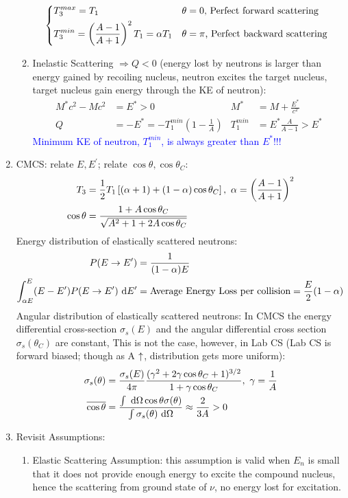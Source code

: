 \documentclass{school-22.101-notes}
\begin{document}
\begin{enumerate}
\begin{enumerate}
\begin{align}
\begin{dcases*}
        T_3^{max} = T_1 &  $\theta = 0$,  Perfect forward scattering \\
        T_3^{min} = \left( \frac{A-1}{A+1} \right)^2 T_1 = \alpha T_1 & $\theta = \pi$, Perfect backward scattering 
        \end{dcases*}
        \end{align}
    \item Inelastic Scattering $\Rightarrow Q < 0$ (energy lost by neutrons is larger than energy gained by recoiling nucleus, neutron excites the target nucleus, target nucleus gain energy through the KE of neutron):
\begin{align}
M^* c^2 - M c^2 &= E^* > 0  & M^* &= M + \frac{E^*}{c^2} \label{M*} \\
Q &= - E^* = -T_1^{min} \left( 1 - \frac{1}{A} \right) & T_1^{min} &= E^* \frac{A}{A-1} > E^* 
\end{align}
\textcolor{blue}{Minimum KE of neutron, $T_1^{min}$, is always greater than $E^*$!!!}
\end{enumerate}
%
\item CMCS: relate $E, E^{\prime}$; relate $\cos \theta, \cos \theta_C$:
    \begin{align}
     T_3 &= \frac{1}{2} T_1 \left[ (\alpha+1 ) + (1-\alpha) \cos \theta_C \right], \mbox{ } \alpha = \left( \frac{A-1}{A+1} \right)^2 \\
    \cos \theta &= \frac{1 + A \cos \theta_C}{\sqrt{A^2 + 1 + 2A \cos \theta_C}} 
    \end{align}
Energy distribution of elastically scattered neutrons:
    \begin{align}
    P(E \to E^{\prime}) &= \frac{1}{(1-\alpha)E} \\
    \int_{\alpha E}^E (E - E^{\prime}) P(E \to E^{\prime}) \mbox{ }\mathrm{d} E^{\prime} &= \mbox{Average Energy Loss per collision}  = \frac{E}{2} (1-\alpha) 
    \end{align}
Angular distribution of elastically scattered neutrons:
In CMCS the energy differential cross-section $\sigma_s(E)$ and the angular differential cross section $\sigma_s(\theta_C)$ are constant,
This is not the case, however, in Lab CS (Lab CS is forward biased; though as A $\uparrow$, distribution gets more uniform):
    \begin{align}
    \sigma_s (\theta) &= \frac{\sigma_s (E)}{4 \pi} \frac{(\gamma^2 + 2 \gamma \cos \theta_C + 1)^{3/2}}{1 + \gamma \cos \theta_C}, \mbox{ } \gamma = \frac{1}{A}  \\
    \overline{\cos \theta} &= \frac{\int \mbox{ }\mathrm{d} \Omega \cos \theta \sigma(\theta)}{\int \sigma_s (\theta) \mbox{ }\mathrm{d} \Omega} \approx \frac{2}{3A} > 0 
    \end{align}
%
%
\item Revisit Assumptions:
\begin{enumerate}
\item Elastic Scattering Assumption: this assumption is valid when $E_n$ is small that it does not provide enough energy to excite the compound nucleus, hence the scattering from ground state of $\nu$, no energy lost for excitation. 


\end{enumerate}
\end{enumerate}
\end{document}
